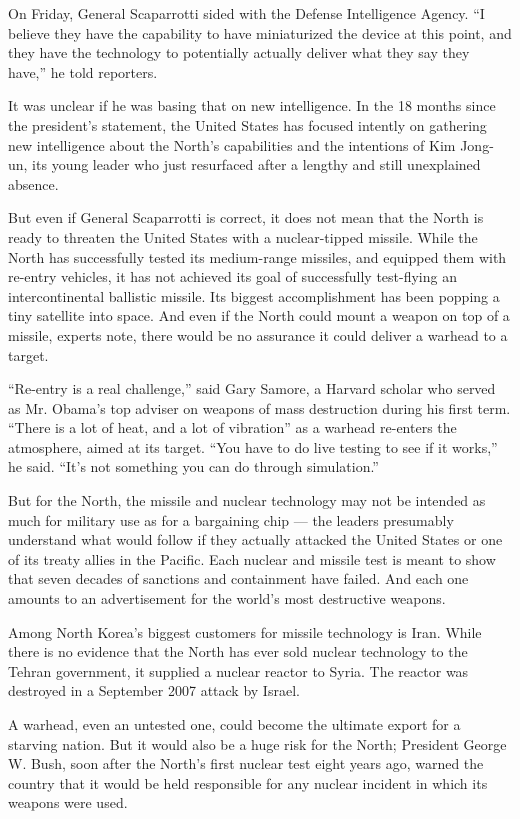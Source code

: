 On Friday, General Scaparrotti sided with the Defense Intelligence
Agency. ``I believe they have the capability to have miniaturized the
device at this point, and they have the technology to potentially
actually deliver what they say they have,'' he told reporters.

It was unclear if he was basing that on new intelligence. In the 18
months since the president's statement, the United States has focused
intently on gathering new intelligence about the North's capabilities
and the intentions of Kim Jong-un, its young leader who just resurfaced
after a lengthy and still unexplained absence.

But even if General Scaparrotti is correct, it does not mean that the
North is ready to threaten the United States with a nuclear-tipped
missile. While the North has successfully tested its medium-range
missiles, and equipped them with re-entry vehicles, it has not achieved
its goal of successfully test-flying an intercontinental ballistic
missile. Its biggest accomplishment has been popping a tiny satellite
into space. And even if the North could mount a weapon on top of a
missile, experts note, there would be no assurance it could deliver a
warhead to a target.

``Re-entry is a real challenge,'' said Gary Samore, a Harvard scholar
who served as Mr. Obama's top adviser on weapons of mass destruction
during his first term. ``There is a lot of heat, and a lot of
vibration'' as a warhead re-enters the atmosphere, aimed at its target.
``You have to do live testing to see if it works,'' he said. ``It's not
something you can do through simulation.''

But for the North, the missile and nuclear technology may not be
intended as much for military use as for a bargaining chip --- the
leaders presumably understand what would follow if they actually
attacked the United States or one of its treaty allies in the Pacific.
Each nuclear and missile test is meant to show that seven decades of
sanctions and containment have failed. And each one amounts to an
advertisement for the world's most destructive weapons.

Among North Korea's biggest customers for missile technology is Iran.
While there is no evidence that the North has ever sold nuclear
technology to the Tehran government, it supplied a nuclear reactor to
Syria. The reactor was destroyed in a September 2007 attack by Israel.

A warhead, even an untested one, could become the ultimate export for a
starving nation. But it would also be a huge risk for the North;
President George W. Bush, soon after the North's first nuclear test
eight years ago, warned the country that it would be held responsible
for any nuclear incident in which its weapons were used.

